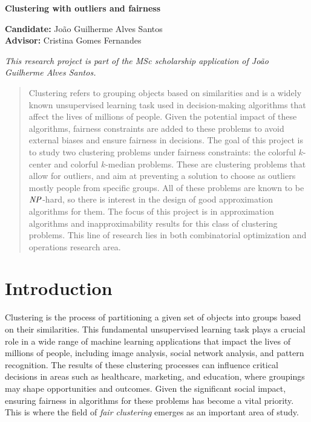 \documentclass[12pt]{article}
\begin{document}
\begin{center}
  
{\Large {\bf Clustering with outliers and fairness} 

}

\vspace{0.2cm}
{\small 
{\bf Candidate:} João Guilherme Alves Santos \\
{\bf Advisor:} Cristina Gomes Fernandes
}

\vspace{3mm} 
{\footnotesize \emph{This research project is part of the MSc scholarship application of João Guilherme Alves Santos.}}

\vspace{5mm} 

\begin{abstract}
Clustering refers to grouping objects based on similarities and is a widely known unsupervised learning task used in decision-making algorithms that affect the lives of millions of people.
Given the potential impact of these algorithms, fairness constraints are added to these problems to avoid external biases and ensure fairness in decisions.
The goal of this project is to study two clustering problems under fairness constraints: the colorful $k$-center and colorful $k$-median problems. 
These are clustering problems that allow for outliers, and aim at preventing a solution to choose as outliers mostly people from specific groups. All of these problems are known to be $\mathit{NP}$-hard, so there is interest in the design of good approximation algorithms for them. 
The focus of this project is in approximation algorithms and inapproximability results for this class of clustering problems.  
This line of research lies in both combinatorial optimization and operations research area.
\end{abstract}

\end{center}

\section{Introduction}
Clustering is the process of partitioning a given set of objects into groups based on their similarities. 
This fundamental unsupervised learning task plays a crucial role in a wide range of machine learning applications that impact the lives of millions of people, including image analysis, social network analysis, and pattern recognition. 
The results of these clustering processes can influence critical decisions in areas such as healthcare, marketing, and education, where groupings may shape opportunities and outcomes.
Given the significant social impact, ensuring fairness in algorithms for these problems has become a vital priority. 
This is where the field of \emph{fair clustering} emerges as an important area of study.
\end{document}
